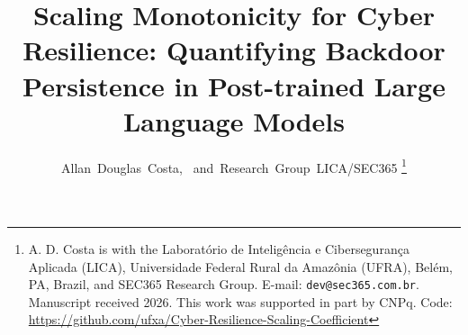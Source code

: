 \documentclass[journal,compsoc]{IEEEtran}
\begin{document}
\title{Scaling Monotonicity for Cyber Resilience: Quantifying Backdoor Persistence
       in Post-trained Large Language Models}

\author{Allan~Douglas~Costa,~
        and~Research~Group~LICA/SEC365%
\thanks{A. D. Costa is with the Laboratório de Inteligência e Cibersegurança
Aplicada (LICA), Universidade Federal Rural da Amazônia (UFRA), Belém, PA,
Brazil, and SEC365 Research Group. E-mail: \texttt{dev@sec365.com.br}.
Manuscript received 2026. This work was supported in part by CNPq.
Code: \url{https://github.com/ufxa/Cyber-Resilience-Scaling-Coefficient}}}


\maketitle














\end{document}
